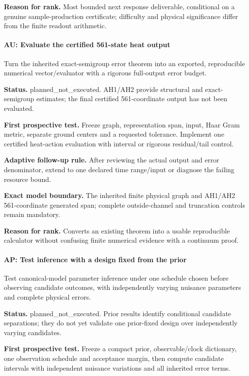 \textbf{Reason for rank.} Most bounded next response deliverable, conditional on a genuine sample-production certificate; difficulty and physical significance differ from the finite readout arithmetic.

\paragraph{AU: Evaluate the certified 561-state heat output} Turn the inherited exact-semigroup error theorem into an exported, reproducible numerical vector/evaluator with a rigorous full-output error budget.

\textbf{Status.} planned\_not\_executed. AH1/AH2 provide structural and exact-semigroup estimates; the final certified 561-coordinate output has not been evaluated.

\textbf{First prospective test.} Freeze graph, representation span, input, Haar Gram metric, separate ground centers and a requested tolerance. Implement one certified heat-action evaluation with interval or rigorous residual/tail control.

\textbf{Adaptive follow-up rule.} After reviewing the actual output and error denominator, extend to one declared time range/input or diagnose the failing resource bound.

\textbf{Exact model boundary.} The inherited finite physical graph and AH1/AH2 561-coordinate generated span; complete outside-channel and truncation controls remain mandatory.

\textbf{Reason for rank.} Converts an existing theorem into a usable reproducible calculator without confusing finite numerical evidence with a continuum proof.

\paragraph{AP: Test inference with a design fixed from the prior} Test canonical-model parameter inference under one schedule chosen before observing candidate outcomes, with independently varying nuisance parameters and complete physical errors.

\textbf{Status.} planned\_not\_executed. Prior results identify conditional candidate separations; they do not yet validate one prior-fixed design over independently varying candidates.

\textbf{First prospective test.} Freeze a compact prior, observable/clock dictionary, one observation schedule and acceptance margin, then compute candidate intervals with independent nuisance variations and all inherited error terms.

